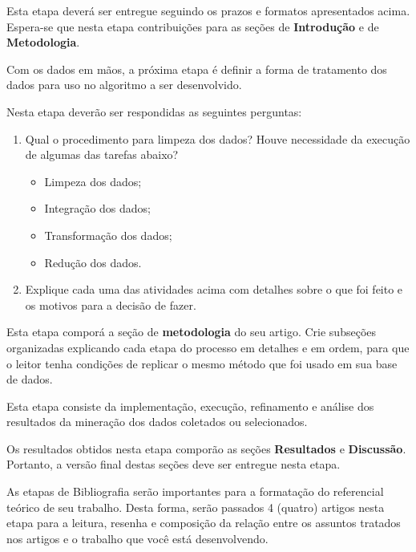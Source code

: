 \documentclass[a4 paper]{article}
\begin{document}
Esta etapa deverá ser entregue seguindo os prazos e formatos apresentados acima. Espera-se que nesta etapa contribuições para as seções de \textbf{Introdução} e de \textbf{Metodologia}.




\newpage
{}

Com os dados em mãos, a próxima etapa é definir a forma de tratamento dos dados para uso no algoritmo a ser desenvolvido.

Nesta etapa deverão ser respondidas as seguintes perguntas:

\begin{enumerate}
    \item Qual o procedimento para limpeza dos dados? Houve necessidade da execução de algumas das tarefas abaixo?
    \begin{itemize}
        \item Limpeza dos dados;
        \item Integração dos dados;
        \item Transformação dos dados;
        \item Redução dos dados.
    \end{itemize}
    \item Explique cada uma das atividades acima com detalhes sobre o que foi feito e os motivos para a decisão de fazer.
\end{enumerate}

Esta etapa comporá a seção de \textbf{metodologia} do seu artigo. Crie subseções organizadas explicando cada etapa do processo em detalhes e em ordem, para que o leitor tenha condições de replicar o mesmo método que foi usado em sua base de dados.

{}

Esta etapa consiste da implementação, execução, refinamento e análise dos resultados da mineração dos dados coletados ou selecionados.


Os resultados obtidos nesta etapa comporão as seções \textbf{Resultados} e \textbf{Discussão}. Portanto, a versão final destas seções deve ser entregue nesta etapa.



As etapas de Bibliografia serão importantes para a formatação do referencial teórico de seu trabalho. Desta forma, serão passados 4 (quatro) artigos nesta etapa para a leitura, resenha e composição da relação entre os assuntos tratados nos artigos e o trabalho que você está desenvolvendo.
\end{document}
